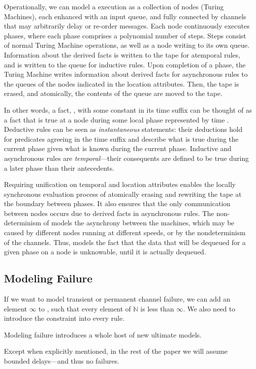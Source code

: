 Operationally, we can model a \lang execution as a collection of nodes (Turing Machines), each enhanced with an input queue, and fully connected by channels that may arbitrarily delay or re-order messages.  Each node continuously executes phases, where each phase comprises a polynomial number of steps.  Steps consist of normal Turing Machine operations, as well as a node writing to its own queue.  Information about the derived facts is written to the tape for atemporal rules, and is written to the queue for inductive rules.  Upon completion of a phase, the Turing Machine writes information about derived facts for asynchronous rules to the queues of the nodes indicated in the location attributes.  Then, the tape is erased, and atomically, the contents of the queue are moved to the tape.

In other words, a fact, , with some constant  in its time suffix can be thought of as a fact that is true at a node during some local phase represented by time .  Deductive rules can be seen as {\em instantaneous} statements: their deductions hold for predicates agreeing in the time suffix and describe what is true during the current phase given what is known during the current phase. Inductive and asynchronous rules are {\em temporal}---their consequents are defined to be true during a later phase than their antecedents.

Requiring unification on temporal and location attributes enables the locally synchronous evaluation process of atomically erasing and rewriting the tape at the boundary between phases.  It also ensures that the only communication between nodes occurs due to derived facts in asynchronous rules.  The non-determinism of  models the asynchrony between the machines, which may be caused by different nodes running at different speeds, or by the nondeterminism of the channels. Thus,  models the fact that the data that will be dequeued for a given phase on a node is unknowable, until it is actually dequeued.

\subsection{Modeling Failure}

If we want \lang to model transient or permanent channel failure, we can add an element $\infty$ to , such that every element of $\mathbb{N}$ is less than $\infty$.  We also need to introduce the constraint  into every \lang rule.

Modeling failure introduces a whole host of new ultimate models. 

Except when explicitly mentioned, in the rest of the paper we will assume bounded delays---and thus no failures.
